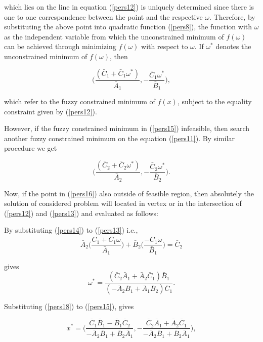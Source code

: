 \documentclass{iaesarticle3}
\begin{document}
which lies on the line in equation (\ref{pers12}) is uniquely determined since there is one to one correspondence between the point and the respective $\omega$. Therefore, by substituting the above point into quadratic function (\ref{pers8}), the function with $\omega$ as the independent variable from which the unconstrained minimum of $f(\omega)$ can be achieved through minimizing $f(\omega)$ with respect to $\omega$. If $\omega^*$ denotes the unconstrained minimum of $f(\omega)$, then

\begin{equation}\label{pers15}
    \bigg(\frac{(\bar{C}_1 + \bar{C}_1\omega^*)}{\bar{A}_1},-\frac{\bar{C}_1\omega^*}{\bar{B}_1}\bigg),
\end{equation}

which refer to the fuzzy constrained minimum of $f(x)$, subject to the equality constraint given by (\ref{pers12}).

However, if the fuzzy constrained minimum in (\ref{pers15}) infeasible, then search another fuzzy constrained minimum on the equation (\ref{pers11}). By similar procedure we get

\begin{equation}\label{pers16}
    \bigg(\frac{(\bar{C}_2 + \bar{C}_2\omega^*)}{\bar{A}_2},-\frac{\bar{C}_2\omega^*}{\bar{B}_2}\bigg).
\end{equation}

Now, if the point in (\ref{pers16}) also outside of feasible region, then absolutely the solution of considered problem will located in vertex or in the intersection of (\ref{pers12}) and (\ref{pers13}) and evaluated as follows:

By substituting (\ref{pers14}) to  (\ref{pers13}) i.e.,
\begin{equation}\label{pers17}
    \bar{A}_2 \Big(\frac{\bar{C}_1 + \bar{C}_1\omega}{\bar{A}_1}\Big) + \bar{B}_2 \Big(\frac{-\bar{C}_1\omega}{\bar{B}_1}\Big) = \bar{C}_2
\end{equation}

gives
\begin{equation}\label{pers18}
    \omega^* = \frac{(\bar{C}_2\bar{A}_1 + \bar{A}_2\bar{C}_1)\bar{B}_1}{(-\bar{A}_2\bar{B}_1 + \bar{A}_1\bar{B}_2)\bar{C}_1}.
\end{equation}

Substituting (\ref{pers18}) to (\ref{pers15}), gives

\begin{equation}\label{pers19}
    x^* = \bigg(\frac{\bar{C}_1\bar{B}_1 - \bar{B}_1\bar{C}_2}{-\bar{A}_2\bar{B}_1 + \bar{B}_2\bar{A}_1}, -\frac{\bar{C}_2\bar{A}_1 + \bar{A}_2\bar{C}_1}{-\bar{A}_2\bar{B}_1 + \bar{B}_2\bar{A}_1}\bigg),
\end{equation}
\end{document}
